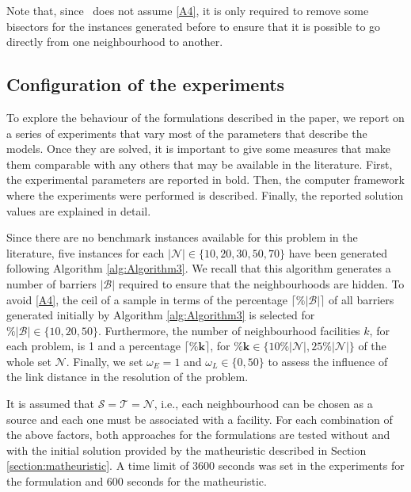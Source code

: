\documentclass[a4paper,  review, authoryear, 1p.]{elsarticle}
\newcommand{\KMPN}{{\sf{H-KMPN}\xspace }}
\newcommand{\CV}[1]{{\color{blue}#1}}
\begin{document}
		
		Note that, since \KMPN \ does not assume \ref{A4}, it is only required to remove some bisectors for the instances generated before to ensure that it is possible to go directly from one neighbourhood to another.
		
		\subsection{Configuration of the experiments}
		To explore the behaviour of the formulations described in the paper, we report on a series of experiments that vary most of the parameters that describe the models. Once they are solved, it is important to give some measures that make them comparable with any others that may be available in the literature. First, the experimental parameters are reported \CV{in bold}. Then, the computer framework where the experiments were performed is described. Finally, the reported solution values are explained in detail. 
		
		Since there are no benchmark instances available for this problem in the literature, five instances for each $\bm{|\mathcal N|}\in\{10, 20, 30, 50, 70\}$ have been generated following Algorithm \ref{alg:Algorithm3}. \CV{We recall that this algorithm generates a number of barriers $|\mathcal B|$ required to ensure that the neighbourhoods are hidden. } To avoid \ref{A4}, \CV{the ceil of a sample in terms of the percentage $\bm{\lceil \% |\mathcal B| \rceil }$ of all barriers generated initially by Algorithm \ref{alg:Algorithm3} is selected for $\bm{\%|\mathcal B|}\in\{10, 20, 50\}$}.  Furthermore, the number of neighbourhood facilities $k$, for each problem, is 1 and a percentage $\bm{\lceil \% k \rceil}$, for $\bm{\% k}\in\{10 \% |\mathcal N|, 25\% |\mathcal N|\}$ of the whole set $\mathcal N$.  Finally, we set \CV{$\omega_E=1$ and $\omega_L\in\{0,50\}$ to assess the influence of the link distance in the resolution of the problem}.
		
		\CV{It is assumed that $\mathcal S=\mathcal T=\mathcal N$, i.e., each neighbourhood can be chosen as a source and each one must be associated with a facility.}
		For each combination of the above factors, both \CV{approaches for the} formulations are tested without and with the initial solution provided by the matheuristic described in Section \ref{section:matheuristic}. A time limit of 3600 seconds was set in the experiments for the formulation and \CV{600} seconds for the matheuristic.
		
\end{document}
